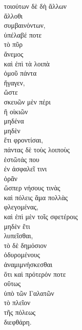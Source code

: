 

{\large
\begin{greek}
\noindent τοιούτων δὲ δὴ ἄλλων \\
\tabto{2em} ἄλλοθι \\
συμβαινόντων, \\
\tabto{2em} ὑπέλαβέ ποτε \\
\tabto{2em} τὸ πῦρ \\
\tabto{2em} ἄνεμος \\
\tabto{2em} καὶ ἐπὶ τὰ λοιπὰ \\
\tabto{4em} ὁμοῦ πάντα \\
\tabto{2em} ἤγαγεν, \\
\tabto{4em} ὥστε \\
\tabto{6em} σκευῶν μὲν πέρι \\
\tabto{8em} ἢ οἰκιῶν \\
\tabto{6em} μηδένα \\
\tabto{6em} μηδὲν \\
\tabto{6em} ἔτι φροντίσαι, \\

\tabto{6em} πάντας δὲ τοὺς λοιποὺς \\
\tabto{8em} ἑστῶτάς που \\
\tabto{10em} ἐν ἀσφαλεῖ τινι \\
\tabto{6em} ὁρᾶν \\
\tabto{8em} ὥσπερ νήσους τινὰς \\
\tabto{6em} καὶ πόλεις ἅμα πολλὰς \\
\tabto{8em} φλεγομένας, \\
\tabto{6em} καὶ ἐπὶ μὲν τοῖς σφετέροις \\
\tabto{8em} μηδὲν ἔτι \\
\tabto{6em} λυπεῖσθαι, \\
\tabto{6em} τὸ δὲ δημόσιον \\
\tabto{8em} ὀδυρομένους \\
\tabto{6em} ἀναμιμνήσκεσθαι \\
\tabto{8em} ὅτι καὶ πρότερόν ποτε \\
\tabto{10em} οὕτως \\
\tabto{12em} ὑπὸ τῶν Γαλατῶν \\
\tabto{10em} τὸ πλεῖον \\
\tabto{12em} τῆς πόλεως \\
\tabto{10em} διεφθάρη.\\

\end{greek}
}

